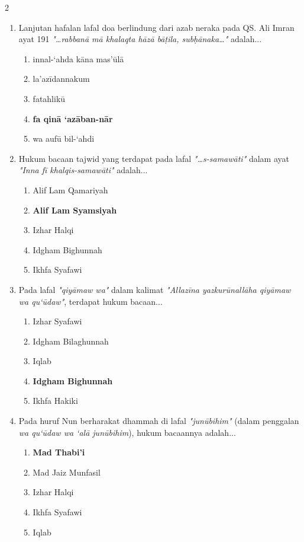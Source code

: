 \documentclass[10pt,a4paper]{article}
\begin{document}
\begin{multicols}{2}
\begin{enumerate}
    \item Lanjutan hafalan lafal doa berlindung dari azab neraka pada QS. Ali Imran ayat 191 \textit{"\dots rabbanā mā khalaqta hāzā bāṭila, subḥānaka\dots"} adalah...
    \begin{enumerate}
      \item innal-‘ahda kāna mas’ūlā
      \item la’azīdannakum
      \item fatahlikū
      \item \textbf{fa qinā ‘azāban-nār}
      \item wa aufū bil-‘ahdi
    \end{enumerate}

    \item Hukum bacaan tajwid yang terdapat pada lafal \textit{"\dots s-samawāti"} dalam ayat \textit{"Inna fī khalqis-samawāti"} adalah...
    \begin{enumerate}
      \item Alif Lam Qamariyah
      \item \textbf{Alif Lam Syamsiyah}
      \item Izhar Halqi
      \item Idgham Bighunnah
      \item Ikhfa Syafawi
    \end{enumerate}

    \item Pada lafal \textit{"qiyāmaw wa"} dalam kalimat \textit{"Allazīna yazkurūnallāha qiyāmaw wa qu‘ūdaw"}, terdapat hukum bacaan...
    \begin{enumerate}
      \item Izhar Syafawi
      \item Idgham Bilaghunnah
      \item Iqlab
      \item \textbf{Idgham Bighunnah}
      \item Ikhfa Hakiki
    \end{enumerate}

    \item Pada huruf Nun berharakat dhammah di lafal \textit{"junūbihim"} (dalam penggalan \textit{wa qu‘ūdaw wa ‘alā junūbihim}), hukum bacaannya adalah...
    \begin{enumerate}
      \item \textbf{Mad Thabi'i}
      \item Mad Jaiz Munfasil
      \item Izhar Halqi
      \item Ikhfa Syafawi
      \item Iqlab
    \end{enumerate}


\end{enumerate}
\end{multicols}
\end{document}
